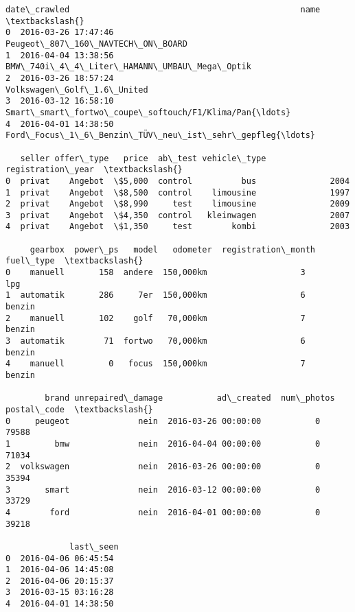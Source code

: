 \documentclass[11pt]{article}
\makeatletter
\newcommand{\boxspacing}{\kern\kvtcb@left@rule\kern\kvtcb@boxsep}
\newcommand{\prompt}[4]{
        {\ttfamily\llap{{\color{#2}[#3]:\hspace{3pt}#4}}\vspace{-\baselineskip}}
    }
\makeatother
\begin{document}
            \begin{tcolorbox}[breakable, size=fbox, boxrule=.5pt, pad at break*=1mm, opacityfill=0]
\prompt{Out}{outcolor}{4}{\boxspacing}
\begin{Verbatim}[commandchars=\\\{\}]
          date\_crawled                                               name  \textbackslash{}
0  2016-03-26 17:47:46                   Peugeot\_807\_160\_NAVTECH\_ON\_BOARD
1  2016-04-04 13:38:56         BMW\_740i\_4\_4\_Liter\_HAMANN\_UMBAU\_Mega\_Optik
2  2016-03-26 18:57:24                         Volkswagen\_Golf\_1.6\_United
3  2016-03-12 16:58:10  Smart\_smart\_fortwo\_coupe\_softouch/F1/Klima/Pan{\ldots}
4  2016-04-01 14:38:50  Ford\_Focus\_1\_6\_Benzin\_TÜV\_neu\_ist\_sehr\_gepfleg{\ldots}

   seller offer\_type   price  ab\_test vehicle\_type  registration\_year  \textbackslash{}
0  privat    Angebot  \$5,000  control          bus               2004
1  privat    Angebot  \$8,500  control    limousine               1997
2  privat    Angebot  \$8,990     test    limousine               2009
3  privat    Angebot  \$4,350  control   kleinwagen               2007
4  privat    Angebot  \$1,350     test        kombi               2003

     gearbox  power\_ps   model   odometer  registration\_month fuel\_type  \textbackslash{}
0    manuell       158  andere  150,000km                   3       lpg
1  automatik       286     7er  150,000km                   6    benzin
2    manuell       102    golf   70,000km                   7    benzin
3  automatik        71  fortwo   70,000km                   6    benzin
4    manuell         0   focus  150,000km                   7    benzin

        brand unrepaired\_damage           ad\_created  num\_photos  postal\_code  \textbackslash{}
0     peugeot              nein  2016-03-26 00:00:00           0        79588
1         bmw              nein  2016-04-04 00:00:00           0        71034
2  volkswagen              nein  2016-03-26 00:00:00           0        35394
3       smart              nein  2016-03-12 00:00:00           0        33729
4        ford              nein  2016-04-01 00:00:00           0        39218

             last\_seen
0  2016-04-06 06:45:54
1  2016-04-06 14:45:08
2  2016-04-06 20:15:37
3  2016-03-15 03:16:28
4  2016-04-01 14:38:50
\end{Verbatim}
\end{tcolorbox}
        
\end{document}
